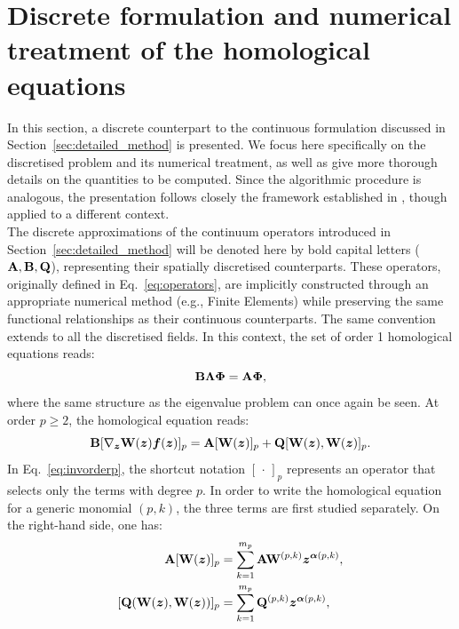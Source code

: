 \documentclass[%
reprint,
superscriptaddress,
 amsmath,amssymb,
 aps,
 pre
]{revtex4-2}
\begin{document}




\appendix



\clearpage
\section{Discrete formulation and numerical treatment of the homological equations}
\label{sec:discrete}

In this section, a discrete counterpart to the continuous formulation discussed in Section~\ref{sec:detailed_method} is presented. We focus here specifically on the discretised problem and its numerical treatment, as well as give more thorough details on the quantities to be computed. Since the algorithmic procedure is analogous, the presentation follows closely the framework established in \cite{vizza2023superharm}, though applied to a different context.\\
The discrete approximations of the continuum operators introduced in Section~\ref{sec:detailed_method} will be denoted here by bold capital letters ($\mathbf{A}, \mathbf{B}, \mathbf{Q}$), representing their spatially discretised counterparts. These operators, originally defined in Eq.~\eqref{eq:operators}, are implicitly constructed through an appropriate numerical method (e.g., Finite Elements) while preserving the same functional relationships as their continuous counterparts. The same convention extends to all the discretised fields.
In this context, the set of order 1 homological equations reads:
\begin{equation}
    \mathbf{B} \boldsymbol{\Lambda} \boldsymbol{\Phi} = \mathbf{A} \boldsymbol{\Phi},
\end{equation}
where the same structure as the eigenvalue problem can once again be seen. 
At order $p\geq2$, the homological equation reads:
\begin{equation}\label{eq:invorderp}
    \mathbf{B} [\nabla_{\boldsymbol{z}} \mathbf{W}({\boldsymbol{z}})\boldsymbol{f}({\boldsymbol{z}})]_p = \mathbf{A}[\mathbf{W}({\boldsymbol{z}})]_p + \mathbf{Q}[\mathbf{W}({\boldsymbol{z}}),\mathbf{W}({\boldsymbol{z}})]_p.
\end{equation}
In Eq.~\eqref{eq:invorderp}, the shortcut notation $[\, \cdot \,]_p$ represents an operator that selects only the terms with degree $p$.
In order to write the homological equation for a generic monomial $(p,k)$, the three terms are first studied separately.
On the right-hand side, one has:
%
\begin{subequations}
\label{eq:rhs_homological}
    \begin{align}
        \bfm{A}[\bfm{W} (\bfz)]_p &= \sum_{k=1}^{m_p} \bfm{A}\bfm{W}^{(p,k)} \bfz^{\bfalpha(p,k)}, \\
        [\bfm{Q} (\bfm{W}(\bfz),\bfm{W}(\bfz))]_p &= \sum_{k=1}^{m_p} \bfm{Q}^{(p,k)} \bfz^{\bfalpha(p,k)}, 
    \end{align}
\end{subequations}
\end{document}

